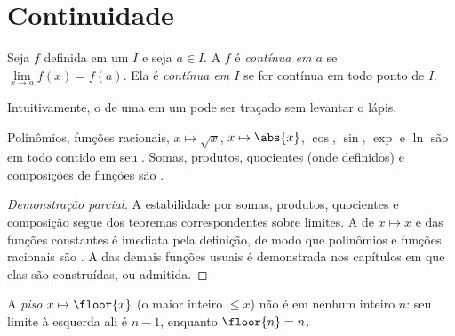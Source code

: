 \section{Continuidade}

\begin{definition}[Continuidade]\label{def:g12:limcont:continuity}
Seja $f$ definida em um  $I$ e seja $a \in I$. A  $f$ é
\emph{contínua em $a$} se
$\lim\limits_{x \to a} f(x) = f(a)$. Ela é \emph{contínua em
$I$} se for contínua em todo ponto de $I$.
\end{definition}

Intuitivamente, o  de uma   em um  pode ser
traçado sem levantar o lápis.

\begin{proposition}\label{prop:g12:limcont:usual}
Polinômios, funções racionais, $x \mapsto \sqrt{x}$, $x \mapsto \abs{x}$,
$\cos$, $\sin$, $\exp$ e $\ln$ são  em todo  contido em
seu . Somas, produtos, quocientes (onde definidos) e composições de
funções  são .
\end{proposition}

\begin{proof}[Demonstração parcial]
A estabilidade por somas, produtos, quocientes e composição segue dos
teoremas correspondentes sobre limites. A  de $x \mapsto x$ e
das funções constantes é imediata pela definição, de modo que polinômios e
funções racionais são . A  das demais funções usuais
é demonstrada nos capítulos em que elas são construídas, ou admitida.
\end{proof}

\begin{example}
A \emph{ piso} $x \mapsto \floor{x}$ (o maior inteiro $\leq x$) não
é  em nenhum inteiro $n$: seu limite à esquerda ali é $n - 1$,
enquanto $\floor{n} = n$.
\end{example}

